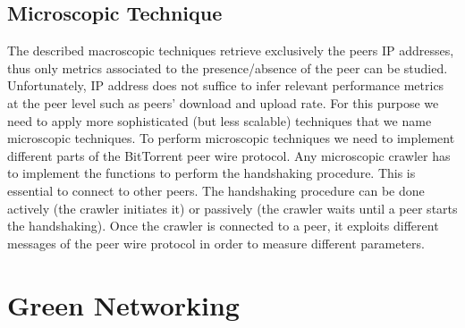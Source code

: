 \subsection{Microscopic Technique}
The described macroscopic techniques retrieve exclusively the peers IP addresses, thus only metrics associated to the presence/absence of the peer can be studied. Unfortunately, IP address does not suffice to infer relevant performance metrics at the peer level such as peers’ download and upload rate. 
For this purpose we need to apply more sophisticated (but less scalable) techniques that we name microscopic techniques.
To perform microscopic techniques we need to implement different parts of the BitTorrent peer wire protocol. 
Any microscopic crawler has to implement the functions to perform the handshaking procedure. 
This is essential to connect to other peers. 
The handshaking procedure can be done actively (the crawler initiates it) or passively (the crawler waits until a peer starts the handshaking). 
Once the crawler is connected to a peer, it exploits different messages of the peer wire protocol in order to measure different parameters. 


\section{Green Networking}

